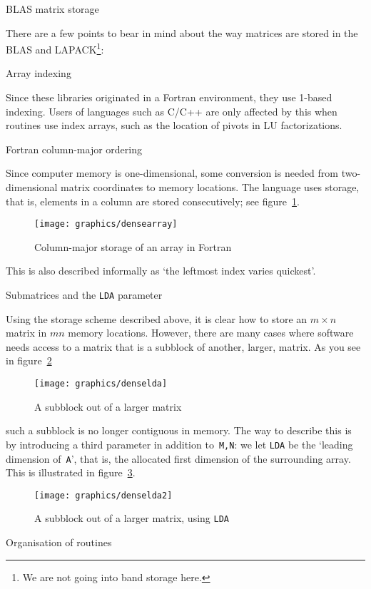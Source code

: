  {BLAS matrix storage}

There are a few points to bear in mind about the way matrices are
stored in the BLAS and LAPACK\footnote{We are not going into band
  storage here.}:

 {Array indexing}

Since these libraries originated in a Fortran environment, they
  use 1-based indexing. Users of languages such as C/C++ are only
  affected by this when routines use index arrays, such as the
  location of pivots in LU factorizations.

 {Fortran column-major ordering}

Since computer memory is one-dimensional, some conversion is needed
from two-dimensional matrix coordinates to memory locations. The
 language uses  storage, that is,
elements in a column are stored consecutively; see
figure~\ref{fig:densearray}.
\begin{figure}
  \texttt{[image: graphics/densearray]}
  \caption{Column-major storage of an array in Fortran}
  \label{fig:densearray}
\end{figure}
This is also described informally as `the leftmost index varies
quickest'.

 {Submatrices and the {\tt LDA} parameter}

Using the storage scheme described above, it is clear how to store an
$m\times n$ matrix in $mn$ memory locations. However, there are many
cases where software needs access to a matrix that is a subblock of
another, larger, matrix. As you see in figure~\ref{fig:lda1}
\begin{figure}[ht]
  \texttt{[image: graphics/denselda]}
  \caption{A subblock out of a larger matrix}
  \label{fig:lda1}
\end{figure}
such a subblock is no longer contiguous in memory. The way to describe
this is by introducing a third parameter in addition to~{\tt M,N}: we
let {\tt LDA} be the `leading dimension of~{\tt A}', that is, the
allocated first dimension of the surrounding array. This is
illustrated in figure~\ref{fig:lda2}.
\begin{figure}
  \texttt{[image: graphics/denselda2]}
  \caption{A subblock out of a larger matrix, using {\tt LDA}}
  \label{fig:lda2}
\end{figure}

 {Organisation of routines}

